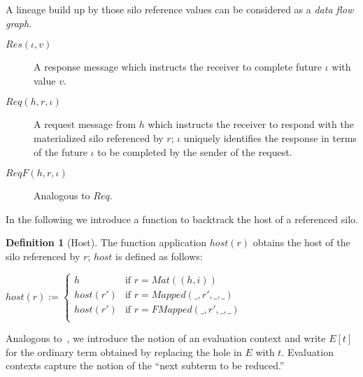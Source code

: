 \documentclass{article}
\theoremstyle{definition}
\newtheorem{defn}{Definition}[section]
\begin{document}
A lineage build up by those silo reference values can be considered as a {\emph{data flow graph}}\cite{???}. %

\begin{description}
\item[$Res(\iota, v)$] A response message which instructs the receiver to complete future $\iota$ with value $v$.

\item[$Req(h, r, \iota)$] A request message from $h$ which instructs the receiver to respond with the materialized silo referenced by $r$; $\iota$ uniquely identifies the response in terms of the future $\iota$ to be completed by the sender of the request.

\item[$ReqF(h, r, \iota)$] Analogous to $Req$.
\end{description}

In the following we introduce a function to backtrack the host of a referenced silo.

\begin{defn}[Host]
  The function application $host(r)$ obtains the host of the silo referenced by $r$; $host$ is defined as follows:
  
  $host(r) := \begin{cases}
    h        & \text{if } r = Mat((h, i)) \\
    host(r') & \text{if } r = Mapped(\_, r', \_, \_) \\
    host(r') & \text{if } r = FMapped(\_, r', \_, \_) \\
    \end{cases}$
\end{defn}

Analogous to~\cite{TAPL}, we introduce the notion of an evaluation context and write $E[t]$ for the ordinary term obtained by replacing the hole in $E$ with $t$. Evaluation contexts capture the notion of the ``next subterm to be reduced.''
\end{document}
